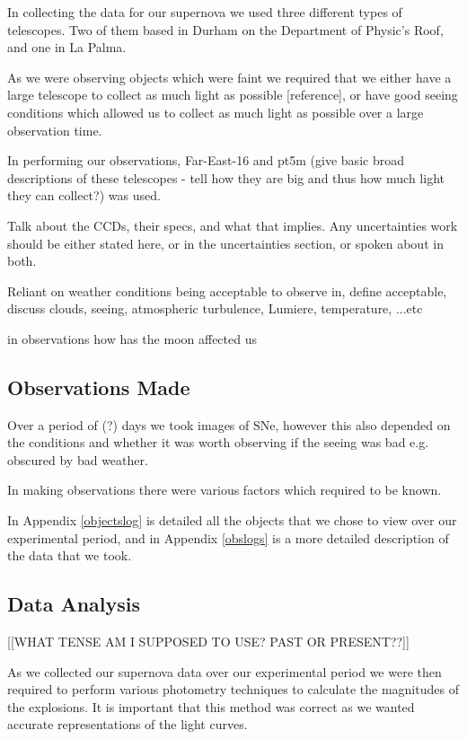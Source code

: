 \documentclass[twocolumn]{revtex4}
\begin{document}
In collecting the data for our supernova we used three different types of telescopes. Two of them based in Durham on the Department of Physic's Roof, and one in La Palma. 

As we were observing objects which were faint we required that we either have a large telescope to collect as much light as possible [reference], or have good seeing conditions which allowed us to collect as much light as possible over a large observation time.

In performing our observations, Far-East-16 and pt5m (give basic broad descriptions of these telescopes - tell how they are big and thus how much light they can collect?) was used. 

Talk about the CCDs, their specs, and what that implies. Any uncertainties work should be either stated here, or in the uncertainties section, or spoken about in both. 

Reliant on weather conditions being acceptable to observe in, define acceptable, discuss clouds, seeing, atmospheric turbulence, Lumiere, temperature, ...etc

in observations how has the moon affected us


\vspace{-3ex}
\subsection{Observations Made}
\vspace{-2ex}

Over a period of (?) days we took images of SNe, however this also depended on the conditions and whether it was worth observing if the seeing was bad e.g. obscured by bad weather.

In making observations there were various factors which required to be known.

In Appendix \ref{objectslog} is detailed all the objects that we chose to view over our experimental period, and in Appendix \ref{obslogs} is a more detailed description of the data that we took.

\vspace{-3ex}
\subsection{Data Analysis}
\vspace{-2ex}

[[WHAT TENSE AM I SUPPOSED TO USE? PAST OR PRESENT??]]

As we collected our supernova data over our experimental period we were then required to perform various photometry techniques to calculate the magnitudes of the explosions. It is important that this method was correct as we wanted accurate representations of the light curves. 
\end{document}
